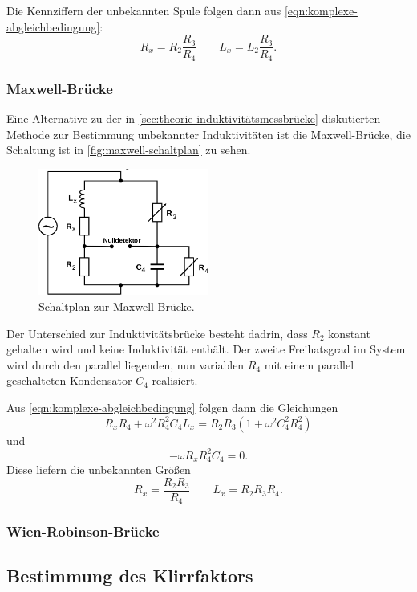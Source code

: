 Die Kennziffern der unbekannten Spule folgen dann aus \autoref{eqn:komplexe-abgleichbedingung}:
\begin{equation}
	R_x = R_2 \frac{R_3}{R_4}
	\qquad
	L_x = L_2 \frac{R_3}{R_4}.
	\label{eqn:values-induktivitaetsbruecke}
\end{equation}


\subsubsection{Maxwell-Brücke}
\label{sec:theorie-maxwell-bruecke}

Eine Alternative zu der in \autoref{sec:theorie-induktivitätsmessbrücke} diskutierten Methode zur
Bestimmung unbekannter Induktivitäten ist die Maxwell-Brücke, die Schaltung ist in 
\autoref{fig:maxwell-schaltplan} zu sehen.
\begin{figure}[H]
	\centering
	\includegraphics[width=0.5\textwidth]{bilder/maxwellbruecke.png}
	\caption{Schaltplan zur Maxwell-Brücke.}
	\label{fig:maxwell-schaltplan}
\end{figure}

Der Unterschied zur Induktivitätsbrücke besteht dadrin, dass $R_2$ konstant gehalten wird und keine 
Induktivität enthält. Der zweite Freihatsgrad im System wird durch den parallel liegenden, nun
variablen $R_4$ mit einem parallel geschalteten Kondensator $C_4$ realisiert.

Aus \autoref{eqn:komplexe-abgleichbedingung} folgen dann die Gleichungen
\begin{equation}
	R_x R_4 + \omega^2 R_4^2 C_4 L_x = R_2 R_3 \left(1 + \omega^2 C_4^2 R_4^2 \right)
	\label{eqn:maxwell-gleichung1}
\end{equation}
und
\begin{equation}
	-\omega R_x R_4^2 C_4 = 0.
	\label{eqn:maxwell-gleichung2}
\end{equation}
Diese liefern die unbekannten Größen
\begin{equation}
	R_x = \frac{R_2 R_3}{R_4}
	\qquad
	L_x = R_2 R_3 R_4.
	\label{eqn:kenngroessen-maxwell}
\end{equation}

\subsubsection{Wien-Robinson-Brücke}
\label{sec:theorie-wien-robinson-bruecke}

\subsection{Bestimmung des Klirrfaktors}
\label{sec:klirrfaktor}

\cite{sample}
